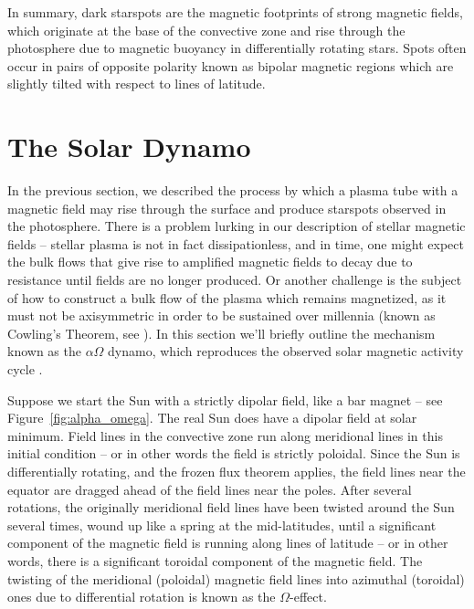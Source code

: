 In summary, dark starspots are the magnetic footprints of strong magnetic fields, which originate at the base of the convective zone and rise through the photosphere due to magnetic buoyancy in differentially rotating stars. Spots often occur in pairs of opposite polarity known as bipolar magnetic regions which are slightly tilted with respect to lines of latitude.

\section{The Solar Dynamo} \label{sec:solardynamo}

In the previous section, we described the process by which a plasma tube with a magnetic field may rise through the surface and produce starspots observed in the photosphere. There is a problem lurking in our description of stellar magnetic fields -- stellar plasma is not in fact dissipationless, and in time, one might expect the bulk flows that give rise to amplified magnetic fields to decay due to resistance until fields are no longer produced. Or another challenge is the subject of how to construct a bulk flow of the plasma which remains magnetized, as it must not be axisymmetric in order to be sustained over millennia (known as Cowling's Theorem, see \citealt{Cowling1933}). In this section we'll briefly outline the mechanism known as the $\alpha  \Omega$ dynamo, which reproduces the observed solar magnetic activity cycle \citep{Hathaway2010, Charbonneau2014}. 

Suppose we start the Sun with a strictly dipolar field, like a bar magnet -- see Figure~\ref{fig:alpha_omega}. The real Sun does have a dipolar field at solar minimum. Field lines in the convective zone run along meridional lines in this initial condition -- or in other words the field is strictly poloidal. Since the Sun is differentially rotating, and the frozen flux theorem applies, the field lines near the equator are dragged ahead of the field lines near the poles. After several rotations, the originally meridional field lines have been twisted around the Sun several times, wound up like a spring at the mid-latitudes, until a significant component of the magnetic field is running along lines of latitude -- or in other words, there is a significant toroidal component of the magnetic field. The twisting of the meridional (poloidal) magnetic field lines into azimuthal (toroidal) ones due to differential rotation is known as the $\Omega$-effect. 

